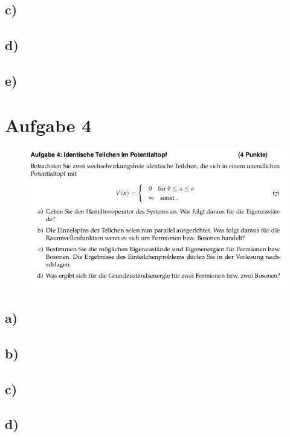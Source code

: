 \subsection{c)}


\subsection{d)}


\subsection{e)}


\section{Aufgabe 4}
\begin{figure}[H]
    \centering
    \includegraphics[width=\textwidth]{images/ex4.jpg}
\end{figure}

\subsection{a)}

\subsection{b)}

\subsection{c)}

\subsection{d)}



